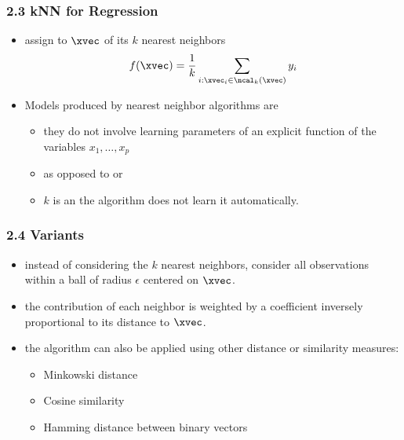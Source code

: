 \begin{frame}
  \frametitle{2.3 kNN for Regression}
  \begin{itemize}
  \item {} assign to $\xvec$ 
     of its $k$ nearest neighbors
    \[ f(\xvec) = \frac1k \sum_{i : \xvec_i \in \ncal_k(\xvec)} y_i \]
  \end{itemize}
  \pause
    \begin{itemize}
    \item {} Models produced by nearest neighbor algorithms are
      \begin{itemize}
      \item they do not involve learning parameters of an explicit function of
        the variables $x_1, \dots, x_p$
      \item as opposed to  or 
      \item $k$ is an  the algorithm does not learn it automatically.
      \end{itemize}
    \end{itemize}
\end{frame}

{
  \begin{frame}
    \frametitle{2.4 Variants}
    \begin{itemize}
    \item {} instead of considering the $k$ nearest
      neighbors, consider all observations within a ball of radius $\epsilon$
      centered on $\xvec$.
    \item {} the contribution of each neighbor is
      weighted by a coefficient inversely proportional to its distance to $\xvec$.
    \item {} the algorithm can also be applied using
      other distance or similarity measures:
      \begin{itemize}
      \item Minkowski distance
      \item Cosine similarity
      \item Hamming distance between binary vectors
      \end{itemize}
    \end{itemize}
  \end{frame}}



